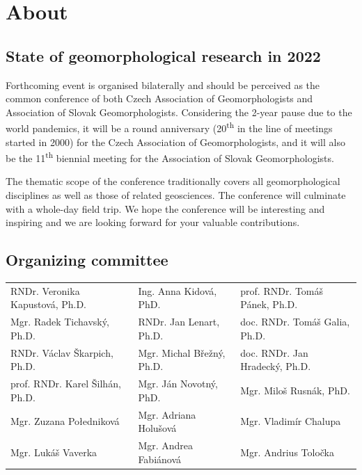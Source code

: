 \documentclass[
	openany, %
	parskip=false, %
	12pt, %
	a4paper, %
]{conferencebooklet} %
\begin{document}

\tableofcontents


\chapter{About}
\section{State of geomorphological research in 2022}
\noindent
Forthcoming event is organised bilaterally and should be perceived as the common conference of both Czech Association of Geomorphologists and Association of Slovak Geomorphologists. Considering the 2-year pause due to the world pandemics, it will be a round anniversary (20\textsuperscript{th} in the line of meetings started in 2000) for the Czech Association of Geomorphologists, and it will also be the 11\textsuperscript{th} biennial meeting for the Association of Slovak Geomorphologists.

The thematic scope of the conference traditionally covers all geomorphological disciplines as well as those of related geosciences. The conference will culminate with a whole-day field trip. We hope the conference will be interesting and inspiring and we are looking forward for your valuable contributions.

\section{Organizing committee}

\begin{center}
	\begin{tabular}{l l l}
		RNDr. Veronika Kapustová, Ph.D. & Ing. Anna Kidová, PhD. & prof. RNDr. Tomáš Pánek, Ph.D.\\
		Mgr. Radek Tichavský, Ph.D. & RNDr. Jan Lenart, Ph.D. & doc. RNDr. Tomáš Galia, Ph.D.\\
		RNDr. Václav Škarpich, Ph.D. & Mgr. Michal Břežný, Ph.D. & doc. RNDr. Jan Hradecký, Ph.D.\\
		prof. RNDr. Karel Šilhán, Ph.D. &Mgr. Ján Novotný, PhD. & Mgr. Miloš Rusnák, PhD.\\
		Mgr. Zuzana Połedniková & Mgr. Adriana Holušová & Mgr. Vladimír Chalupa\\
		Mgr. Lukáš Vaverka & Mgr. Andrea Fabiánová & Mgr. Andrius Toločka 
	
	\end{tabular}
\end{center}
\end{document}
